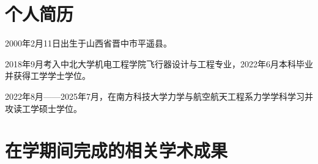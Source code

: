 
\begin{resume}

  \section*{个人简历} %

 2000年2月11日出生于山西省晋中市平遥县。

 2018年9月考入中北大学机电工程学院飞行器设计与工程专业，2022年6月本科毕业并获得工学学士学位。

 2022年8月——2025年7月，在南方科技大学力学与航空航天工程系力学学科学习并攻读工学硕士学位。








  \section*{在学期间完成的相关学术成果}



\end{resume}
